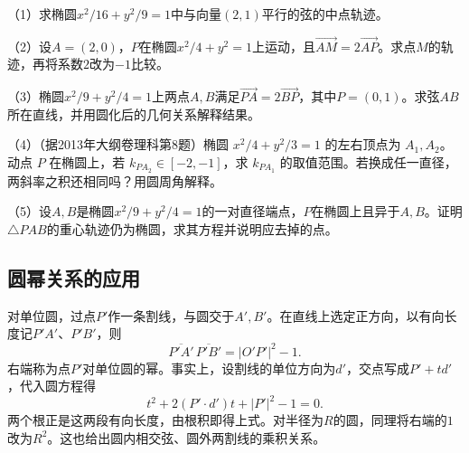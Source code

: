 \begin{exercise}
\mbox{}\par\nobreak

\begin{samepage}
（1）求椭圆\(x^2/16+y^2/9=1\)中与向量\((2,1)\)平行的弦的中点轨迹。
\par
\end{samepage}

\begin{samepage}
（2）设\(A=(2,0)\)，\(P\)在椭圆\(x^2/4+y^2=1\)上运动，且\(\overrightarrow{AM}=2\overrightarrow{AP}\)。求点\(M\)的轨迹，再将系数\(2\)改为\(-1\)比较。
\par
\end{samepage}

\begin{samepage}
（3）椭圆\(x^2/9+y^2/4=1\)上两点\(A,B\)满足\(\overrightarrow{PA}=2\overrightarrow{BP}\)，其中\(P=(0,1)\)。求弦\(AB\)所在直线，并用圆化后的几何关系解释结果。
\par
\end{samepage}
\begin{samepage}
（4）（据2013年大纲卷理科第8题）椭圆 \(x^2/4+y^2/3=1\) 的左右顶点为 \(A_1,A_2\)。动点 \(P\) 在椭圆上，若 \(k_{PA_2}\in[-2,-1]\)，求 \(k_{PA_1}\) 的取值范围。若换成任一直径，两斜率之积还相同吗？用圆周角解释。
\par
\end{samepage}
\begin{samepage}
（5）设\(A,B\)是椭圆\(x^2/9+y^2/4=1\)的一对直径端点，\(P\)在椭圆上且异于\(A,B\)。证明\(\triangle PAB\)的重心轨迹仍为椭圆，求其方程并说明应去掉的点。
\par
\end{samepage}
\end{exercise}

\subsection{圆幂关系的应用}
\label{subsec:quadratic-affine-power-relations}

对单位圆，过点\(P'\)作一条割线，与圆交于\(A',B'\)。在直线上选定正方向，以有向长度记\(P'A'\)、\(P'B'\)，则
\begin{equation}\label{eq:quadratic-circle-power-signed}
    \overline{P'A'}\,\overline{P'B'}=|O'P'|^2-1 .
\end{equation}
右端称为点\(P'\)对单位圆的{\heiti{}幂}。事实上，设割线的单位方向为\(d'\)，交点写成\(P'+t d'\)，代入圆方程得
\begin{equation*}
    t^2+2(P'\cdot d')t+|P'|^2-1=0 .
\end{equation*}
两个根正是这两段有向长度，由根积即得上式。对半径为\(R\)的圆，同理将右端的\(1\)改为\(R^2\)。这也给出圆内相交弦、圆外两割线的乘积关系。


